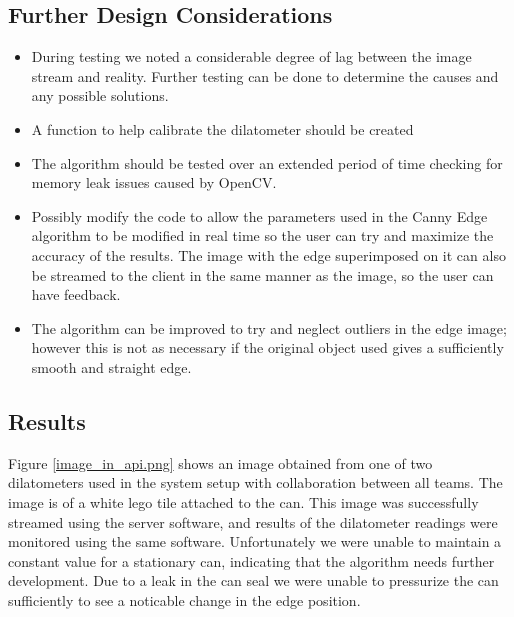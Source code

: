 \subsection{Further Design Considerations}

\begin{itemize}
	\item During testing we noted a considerable degree of lag between the image stream and reality. Further testing can be done to determine the causes and any possible solutions.
	\item A function to help calibrate the dilatometer should be created
	\item The algorithm should be tested over an extended period of time checking for memory leak issues caused by OpenCV.
	\item Possibly modify the code to allow the parameters used in the Canny Edge algorithm to be modified in real time so the user can try and maximize the accuracy of the results.  The image with the edge superimposed on it can also be streamed to the client in the same manner as the image, so the user can have feedback.

	\item The algorithm can be improved to try and neglect outliers in the edge image; however this is not as necessary if the original object used gives a sufficiently smooth and straight edge.
\end{itemize}


\subsection{Results}

Figure \ref{image_in_api.png} shows an image obtained from one of two dilatometers used in the system setup with collaboration between all teams. The image is of a white lego tile attached to the can. This image was successfully streamed using the server software, and results of the dilatometer readings were monitored using the same software. Unfortunately we were unable to maintain a constant value for a stationary can, indicating that the algorithm needs further development. Due to a leak in the can seal we were unable to pressurize the can sufficiently to see a noticable change in the edge position.

